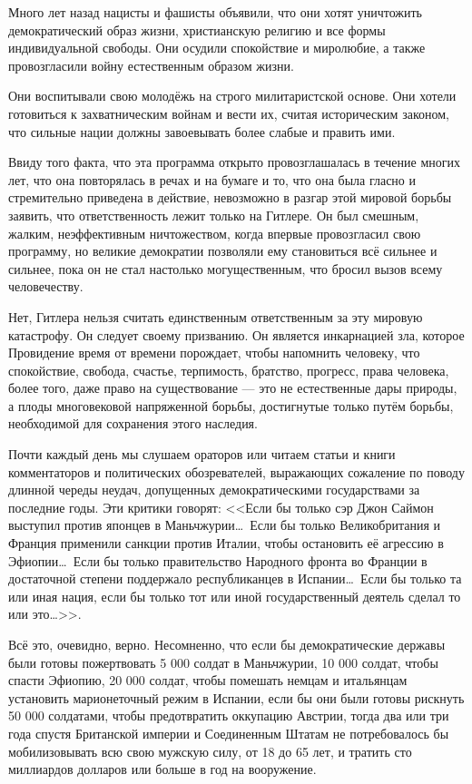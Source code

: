 Много лет назад нацисты и фашисты объявили, что они хотят уничтожить демократический образ жизни, христианскую религию и все формы индивидуальной свободы. Они осудили спокойствие и миролюбие, а также провозгласили войну естественным образом жизни.

Они воспитывали свою молодёжь на строго милитаристской основе. Они хотели готовиться к захватническим войнам и вести их, считая историческим законом, что сильные нации должны завоевывать более слабые и править ими.

Ввиду того факта, что эта программа открыто провозглашалась в течение многих лет, что она повторялась в речах и на бумаге и то, что она была гласно и стремительно приведена в действие, невозможно в разгар этой мировой борьбы заявить, что ответственность лежит только на Гитлере. Он был смешным, жалким, неэффективным ничтожеством, когда впервые провозгласил свою программу, но великие демократии позволяли ему становиться всё сильнее и сильнее, пока он не стал настолько могущественным, что бросил вызов всему человечеству.

Нет, Гитлера нельзя считать единственным ответственным за эту мировую катастрофу. Он следует своему призванию. Он является инкарнацией зла, которое Провидение время от времени порождает, чтобы напомнить человеку, что спокойствие, свобода, счастье, терпимость, братство, прогресс, права человека, более того, даже право на существование — это не естественные дары природы, а плоды многовековой напряженной борьбы, достигнутые только путём борьбы, необходимой для сохранения этого наследия.

Почти каждый день мы слушаем ораторов или читаем статьи и книги комментаторов и политических обозревателей, выражающих сожаление по поводу длинной череды неудач, допущенных демократическими государствами за последние годы. Эти критики говорят: <<Если бы только сэр Джон Саймон выступил против японцев в Маньчжурии\ldots\ Если бы только Великобритания и Франция применили санкции против Италии, чтобы остановить её агрессию в Эфиопии\ldots\ Если бы только правительство Народного фронта во Франции в достаточной степени поддержало республиканцев в Испании\ldots\ Если бы только та или иная нация, если бы только тот или иной государственный деятель сделал то или это\ldots>>.

Всё это, очевидно, верно. Несомненно, что если бы демократические державы были готовы пожертвовать 5 000 солдат в Маньчжурии, 10 000 солдат, чтобы спасти Эфиопию, 20 000 солдат, чтобы помешать немцам и итальянцам установить марионеточный режим в Испании, если бы они были готовы рискнуть 50 000 солдатами, чтобы предотвратить оккупацию Австрии, тогда два или три года спустя Британской империи и Соединенным Штатам не потребовалось бы мобилизовывать всю свою мужскую силу, от 18 до 65 лет, и тратить сто миллиардов долларов или больше в год на вооружение.

